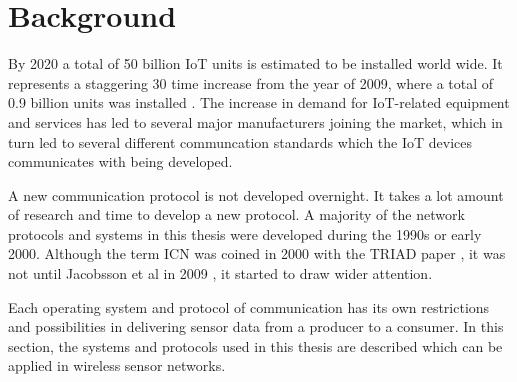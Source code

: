 \section{Background}

%
By 2020 a total of 50 billion IoT units is estimated to be installed world wide. It represents a staggering 30 time increase from the year of 2009, where a total of 0.9 billion units was installed \cite{alanCarlton}\cite{Gartner}.  The increase in demand for IoT-related equipment and services has led to several major manufacturers joining the market, which in turn led to several different communcation standards which the IoT devices communicates with being developed. 

A new communication protocol is not developed overnight. It takes a lot amount of research and time to develop a new protocol. A majority of the network protocols and systems in this thesis were developed during the 1990s or early 2000. Although the term ICN was coined in 2000 with the TRIAD paper \cite{TRIAD}, it was not until Jacobsson et al in 2009 \cite{Jacobson2009}, it started to draw wider attention.

Each operating system and protocol of communication has its own restrictions and possibilities in delivering sensor data from a producer to a consumer.
In this section, the systems and protocols used in this thesis are described which can be applied in wireless sensor networks.







%
